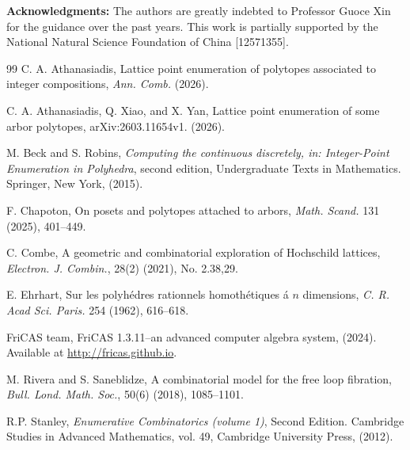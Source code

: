 \documentclass[reqno, 12pt]{article}
\theoremstyle{mydefinition}
\theoremstyle{myremark}
\begin{document}







\noindent
{\small \textbf{Acknowledgments:}}
The authors are greatly indebted to Professor Guoce Xin for the guidance over the past years. 
This work is partially supported by the National Natural Science Foundation of China [12571355].

\begin{thebibliography}{99}
 C. A. Athanasiadis, Lattice point enumeration of polytopes associated to integer compositions, \emph{Ann. Comb.} (2026).

 C. A. Athanasiadis, Q. Xiao, and X. Yan, Lattice point enumeration of some arbor polytopes, arXiv:2603.11654v1. (2026).

 M. Beck and S. Robins, \emph{Computing the continuous discretely, in: Integer-Point Enumeration in Polyhedra}, second edition, Undergraduate Texts in Mathematics. Springer, New York, (2015).

 F. Chapoton, On posets and polytopes attached to arbors, \emph{Math. Scand.} 131 (2025), 401--449.

 C. Combe, A geometric and combinatorial exploration of Hochschild lattices, \emph{Electron. J. Combin.}, 28(2) (2021), No. 2.38,29.

 E. Ehrhart, Sur les polyh\'edres rationnels homoth\'etiques \'a $n$ dimensions, \emph{C. R. Acad Sci. Paris.} 254 (1962), 616--618.

 FriCAS team, FriCAS 1.3.11--an advanced computer algebra system, (2024). Available at \url{http://fricas.github.io}.

 M. Rivera and S. Saneblidze, A combinatorial model for the free loop fibration, \emph{Bull. Lond. Math. Soc.}, 50(6) (2018), 1085--1101.

 R.P. Stanley, \emph{Enumerative Combinatorics (volume 1)}, Second Edition. Cambridge Studies in Advanced Mathematics, vol. 49, Cambridge University Press, (2012).

\end{thebibliography}
\end{document}
